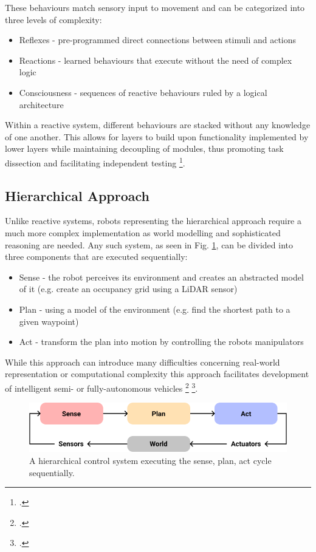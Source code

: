 These behaviours match sensory input to movement and can be categorized into three levels of complexity:
\begin{itemize}
	\item Reflexes - pre-programmed direct connections between stimuli and actions
	\item Reactions - learned behaviours that execute without the need of complex logic 
	\item Consciousness - sequences of reactive behaviours ruled by a logical architecture
\end{itemize}

Within a reactive system, different behaviours are stacked without any knowledge of one another. This allows for layers to build upon functionality implemented by lower layers while maintaining decoupling of modules, thus promoting task dissection and facilitating independent testing \footcite{faigl2017controlParadigms}.


\subsection{Hierarchical Approach}
Unlike reactive systems, robots representing the hierarchical approach require a much more complex implementation as world modelling and sophisticated reasoning are needed. 
Any such system, as seen in Fig. \ref{fig:hierarchicalApproach}, can be divided into three components that are executed sequentially:
\begin{itemize}
	\item Sense - the robot perceives its environment and creates an abstracted model of it (e.g. create an occupancy grid using a LiDAR sensor)
	\item Plan - using a model of the environment (e.g. find the shortest path to a given waypoint)
	\item Act - transform the plan into motion by controlling the robots manipulators
\end{itemize}

While this approach can introduce many difficulties concerning real-world representation or computational complexity this approach facilitates development of intelligent semi- or fully-autonomous vehicles \footcite{faigl2017controlParadigms} \footcite{burgard2020controlParadigms}.

\begin{figure}
	\centering
	\includegraphics[width=0.9\linewidth]{img/hierarchical}
	\caption{
		A hierarchical control system executing the sense, plan, act cycle sequentially.
	}
	\label{fig:hierarchicalApproach}
\end{figure}

